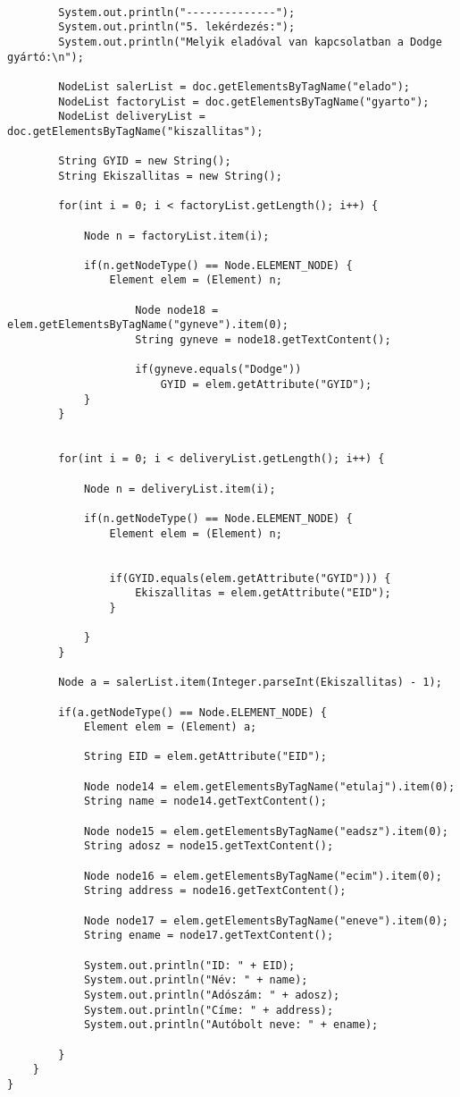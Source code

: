 \documentclass[14pt]{extarticle}
\begin{document}
\begin{normalsize}
\begin{verbatim}
		
		System.out.println("--------------");
		System.out.println("5. lekérdezés:");
		System.out.println("Melyik eladóval van kapcsolatban a Dodge gyártó:\n");
		
		NodeList salerList = doc.getElementsByTagName("elado");
		NodeList factoryList = doc.getElementsByTagName("gyarto");
		NodeList deliveryList = doc.getElementsByTagName("kiszallitas");
		
		String GYID = new String();
		String Ekiszallitas = new String();

		for(int i = 0; i < factoryList.getLength(); i++) {
			
			Node n = factoryList.item(i);
				
			if(n.getNodeType() == Node.ELEMENT_NODE) {
				Element elem = (Element) n;
				
					Node node18 = elem.getElementsByTagName("gyneve").item(0);
					String gyneve = node18.getTextContent();
					
					if(gyneve.equals("Dodge"))
						GYID = elem.getAttribute("GYID");       						
			}
		}
		
		
		for(int i = 0; i < deliveryList.getLength(); i++) {
			
			Node n = deliveryList.item(i);
				
			if(n.getNodeType() == Node.ELEMENT_NODE) {
				Element elem = (Element) n;
				
				
				if(GYID.equals(elem.getAttribute("GYID"))) {
					Ekiszallitas = elem.getAttribute("EID");
				}

			}
		}
				
		Node a = salerList.item(Integer.parseInt(Ekiszallitas) - 1);
				
		if(a.getNodeType() == Node.ELEMENT_NODE) {
			Element elem = (Element) a;
				
			String EID = elem.getAttribute("EID"); 
					
			Node node14 = elem.getElementsByTagName("etulaj").item(0);
			String name = node14.getTextContent();
					
		    Node node15 = elem.getElementsByTagName("eadsz").item(0);
		    String adosz = node15.getTextContent();
		            	  
		    Node node16 = elem.getElementsByTagName("ecim").item(0);
		    String address = node16.getTextContent();
		            	  
		    Node node17 = elem.getElementsByTagName("eneve").item(0);
		    String ename = node17.getTextContent();
		                
		    System.out.println("ID: " + EID);
		    System.out.println("Név: " + name);
		    System.out.println("Adószám: " + adosz);
		    System.out.println("Címe: " + address);
		    System.out.println("Autóbolt neve: " + ename);
		           					
		}
	}
}

		\end{verbatim}
	\end{normalsize}	    
		
\end{document}
